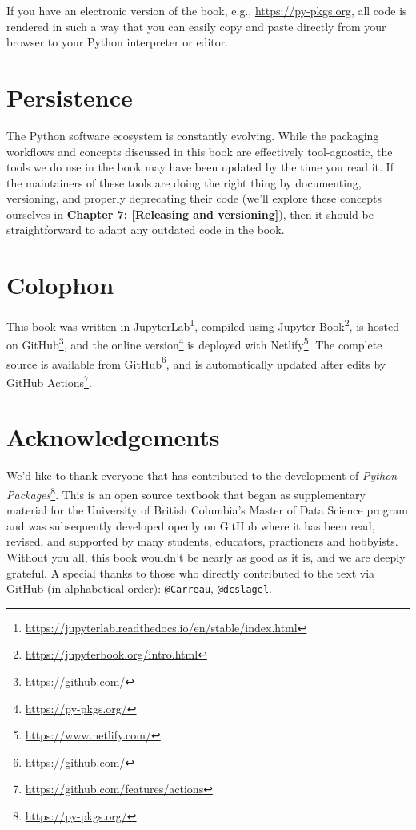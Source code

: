 \documentclass[
]{krantz}
\renewcommand{\href}[2]{#2\footnote{\url{#1}}}
\begin{document}
If you have an electronic version of the book, e.g., \url{https://py-pkgs.org}, all code is rendered in such a way that you can easily copy and paste directly from your browser to your Python interpreter or editor.

\hypertarget{persistence}{%
\section*{Persistence}\label{persistence}}


The Python software ecosystem is constantly evolving. While the packaging workflows and concepts discussed in this book are effectively tool-agnostic, the tools we do use in the book may have been updated by the time you read it. If the maintainers of these tools are doing the right thing by documenting, versioning, and properly deprecating their code (we'll explore these concepts ourselves in \textbf{Chapter 7: {[}Releasing and versioning{]}}), then it should be straightforward to adapt any outdated code in the book.

\hypertarget{colophon}{%
\section*{Colophon}\label{colophon}}


This book was written in \href{https://jupyterlab.readthedocs.io/en/stable/index.html}{JupyterLab}, compiled using \href{https://jupyterbook.org/intro.html}{Jupyter Book}, is hosted on \href{https://github.com/}{GitHub}, and the \href{https://py-pkgs.org/}{online version} is deployed with \href{https://www.netlify.com/}{Netlify}. The complete source is available from \href{https://github.com/}{GitHub}, and is automatically updated after edits by \href{https://github.com/features/actions}{GitHub Actions}.

\hypertarget{acknowledgements}{%
\section*{Acknowledgements}\label{acknowledgements}}


We'd like to thank everyone that has contributed to the development of \href{https://py-pkgs.org/}{\emph{Python Packages}}. This is an open source textbook that began as supplementary material for the University of British Columbia's Master of Data Science program and was subsequently developed openly on GitHub where it has been read, revised, and supported by many students, educators, practioners and hobbyists. Without you all, this book wouldn't be nearly as good as it is, and we are deeply grateful. A special thanks to those who directly contributed to the text via GitHub (in alphabetical order): \texttt{@Carreau}, \texttt{@dcslagel}.
\end{document}
